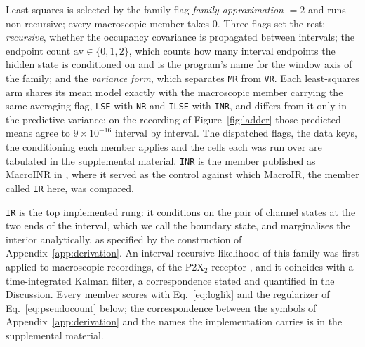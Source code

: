 Least squares is selected by the family flag \emph{family approximation} $= 2$ and runs
non-recursive; every macroscopic member takes $0$. Three flags set the rest: \emph{recursive},
whether the occupancy covariance is propagated between intervals; the endpoint count
$\mathrm{av}\in\{0,1,2\}$, which counts how many interval endpoints the hidden state is
conditioned on and is the program's name for the window axis of the family; and the
\emph{variance form}, which separates \texttt{MR} from \texttt{VR}. Each least-squares arm shares
its mean model exactly with the macroscopic member carrying the same averaging flag, \texttt{LSE}
with \texttt{NR} and \texttt{ILSE} with \texttt{INR}, and differs from it only in the predictive
variance: on the recording of Figure~\ref{fig:ladder} those predicted means agree to
$9\times10^{-16}$ interval by interval. The dispatched flags, the data keys, the conditioning each
member applies and the cells each was run over are tabulated in the supplemental material.
\texttt{INR} is the member published as MacroINR in \citet{moffatt2025bayesian}, where it served as
the control against which MacroIR, the member called \texttt{IR} here, was compared.

\texttt{IR} is the top implemented rung: it conditions on the pair of channel states at the two ends
of the interval, which we call the boundary state, and marginalises the interior analytically, as
specified by the construction of Appendix~\ref{app:derivation}. An interval-recursive likelihood of
this family was first applied to macroscopic recordings, of the P2X$_2$ receptor
\citep{moffatt2025bayesian}, and it coincides with a time-integrated Kalman filter, a correspondence
stated and quantified in the Discussion. Every member scores with Eq.~\ref{eq:loglik} and the
regularizer of Eq.~\ref{eq:pseudocount} below; the correspondence between the symbols of
Appendix~\ref{app:derivation} and the names the implementation carries is in the supplemental material.

